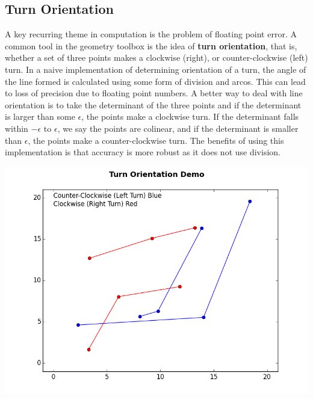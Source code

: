 \documentclass[12pt]{article}
\begin{document}
\begin{multicols}{2}
\subsection{Turn Orientation}

\indent A key recurring theme in computation is the problem of floating point error. A common tool in the geometry toolbox is the idea of \textbf{turn orientation}, that is, whether a set of three points makes a clockwise (right), or counter-clockwise (left) turn. In a naive implementation of determining orientation of a turn, the angle of the line formed is calculated using some form of division and arcos. This can lead to loss of precision due to floating point numbers. \newline
\indent A better way to deal with line orientation is to take the determinant of the three points and if the determinant is larger than some $\epsilon$, the points make a clockwise turn. If the determinant falls within $-\epsilon$ to $\epsilon$, we say the points are colinear, and if the determinant is smaller than $\epsilon$, the points make a counter-clockwise turn. The benefits of using this implementation is that accuracy is more robust as it does not use division. \newline \\
\centerline{\includegraphics[scale=.4]{turn_orientation.png}}


\end{multicols}
\end{document}
